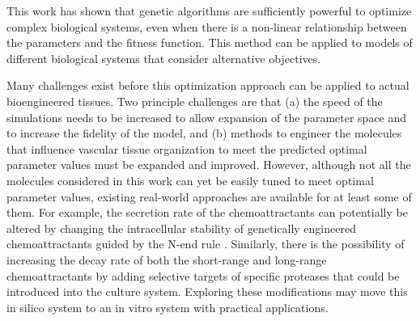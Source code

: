This work has shown that genetic algorithms are sufficiently powerful to optimize
complex biological systems, even when there is a non-linear relationship between the
parameters and the fitness function. This method can be applied to models of
different biological systems that consider alternative objectives.

Many challenges exist before this optimization approach can be applied to actual
bioengineered tissues. Two principle challenges are that (a) the speed of the
simulations needs to be increased to allow expansion of the parameter space and to
increase the fidelity of the model, and (b) methods to engineer the molecules that
influence vascular tissue organization to meet the predicted optimal parameter values
must be expanded and improved. However, although not all the molecules considered in
this work can yet be easily tuned to meet optimal parameter values, existing
real-world approaches are available for at least some of them. For example, the
secretion rate of the chemoattractants can potentially be altered by changing the
intracellular stability of genetically engineered chemoattractants guided by the
N-end rule \cite{Varshavsky2011Nend}. Similarly, there is the possibility of
increasing the decay rate of both the short-range and long-range chemoattractants by
adding selective targets of specific proteases that could be introduced into the
culture system. Exploring these modifications may move this in silico system to an in
vitro system with practical applications.

